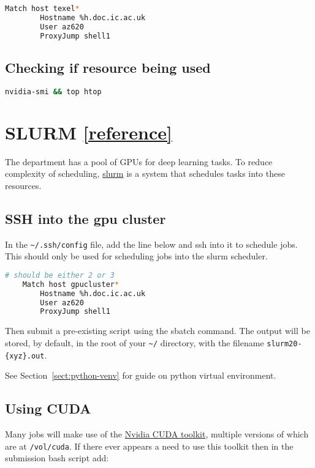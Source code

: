 \documentclass[11pt]{article}
\begin{document}
\begin{lstlisting}[language=bash]
    Match host texel*
        Hostname %h.doc.ic.ac.uk
        User az620
        ProxyJump shell1
\end{lstlisting}

\subsection{Checking if resource being used}

\begin{lstlisting}[language=bash]
    nvidia-smi && top htop
\end{lstlisting}

\section{SLURM \href{https://www.imperial.ac.uk/computing/people/csg/guides/hpcomputing/gpucluster/}{[reference]}}

The department has a pool of GPUs for deep learning tasks. To reduce complexity of scheduling, \href{https://slurm.schedmd.com/}{slurm} is a system that schedules tasks into these resources.

\subsection{SSH into the gpu cluster}

In the \verb|~/.ssh/config| file, add the line below and ssh into it to schedule jobs. This should only be used for scheduling jobs into the slurm scheduler.

\begin{lstlisting}[language=bash]
    # should be either 2 or 3
    Match host gpucluster*
        Hostname %h.doc.ic.ac.uk
        User az620
        ProxyJump shell1
\end{lstlisting}

Then submit a pre-existing script using the sbatch command. The output will be stored, by default, in the root of your \verb|~/| directory, with the filename \verb|slurm20-{xyz}.out|. 

See Section~\ref{sect:python-venv} for guide on python virtual environment.

\subsection{Using CUDA}

Many jobs will make use of the \href{https://developer.nvidia.com/cuda-toolkit}{Nvidia CUDA toolkit}, multiple versions of which are at \texttt{/vol/cuda}. If there ever appears a need to use this toolkit then in the submission bash script add:
\end{document}
